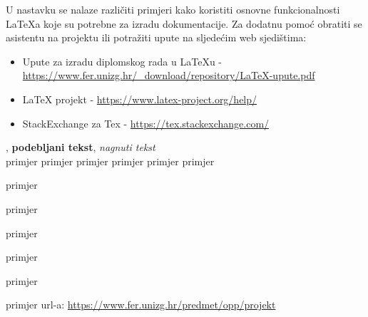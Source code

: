 		U nastavku se nalaze različiti primjeri kako koristiti osnovne funkcionalnosti LaTeXa koje su potrebne za izradu dokumentacije. Za dodatnu pomoć obratiti se asistentu na projektu ili potražiti upute na sljedećim web sjedištima:
		\begin{itemize}
			\item Upute za izradu diplomskog rada u LaTeXu - \url{https://www.fer.unizg.hr/_download/repository/LaTeX-upute.pdf}
			\item LaTeX projekt - \url{https://www.latex-project.org/help/}
			\item StackExchange za Tex - \url{https://tex.stackexchange.com/}\\
		
		\end{itemize} 	


		
		
		, 
		\textbf{podebljani tekst}, 
		\textit{nagnuti tekst}\\
		\normalsize primjer
		\large primjer
		\Large primjer
		\LARGE {primjer}
		\huge {primjer}
		\Huge primjer
		\normalsize
				
		\begin{packed_item}
			
			\item  primjer
			\item  primjer
			\item  primjer
			\item[] \begin{packed_enum}
				
				\item primjer
				\item primjer
			\end{packed_enum}
			
		\end{packed_item}
		
		\noindent primjer url-a: \url{https://www.fer.unizg.hr/predmet/opp/projekt}
		

